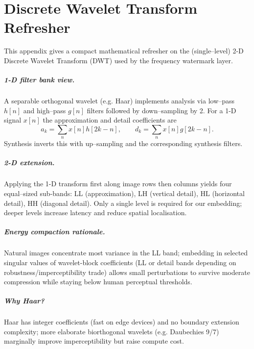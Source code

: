 \chapter{Discrete Wavelet Transform Refresher}\label{app:dwt}

This appendix gives a compact mathematical refresher on the (single–level) 2-D
Discrete Wavelet Transform (DWT) used by the frequency watermark layer.

\paragraph{1-D filter bank view.} A separable orthogonal wavelet (e.g. Haar)
implements analysis via low–pass $h[n]$ and high–pass $g[n]$ filters followed by
down–sampling by 2. For a 1-D signal $x[n]$ the approximation and detail
coefficients are
\[
  a_k = \sum_n x[n] h[2k-n],\qquad d_k = \sum_n x[n] g[2k-n].
\]
Synthesis inverts this with up–sampling and the corresponding synthesis filters.

\paragraph{2-D extension.} Applying the 1-D transform first along image rows
then columns yields four equal–sized sub-bands: LL (approximation), LH (vertical
detail), HL (horizontal detail), HH (diagonal detail). Only a single level is
required for our embedding; deeper levels increase latency and reduce spatial
localisation.

\paragraph{Energy compaction rationale.} Natural images concentrate most
variance in the LL band; embedding in selected singular values of wavelet-block
coefficients (LL or detail bands depending on robustness/imperceptibility
trade) allows small perturbations to survive moderate compression while staying
below human perceptual thresholds.

\paragraph{Why Haar?} Haar has integer coefficients (fast on edge devices) and
no boundary extension complexity; more elaborate biorthogonal wavelets (e.g.
Daubechies 9/7) marginally improve imperceptibility but raise compute cost.

